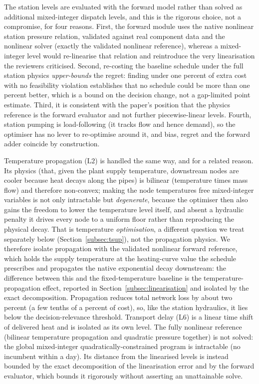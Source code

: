 \documentclass[a4paper,fleqn]{cas-sc}
\newcommand{\Ltwo}{\ensuremath{\mathrm{L2}}}    %
\newcommand{\Lsix}{\ensuremath{\mathrm{L6}}}    %
\begin{document}
The station levels are evaluated with the forward model rather than solved as additional
mixed-integer dispatch levels, and this is the rigorous choice, not a compromise, for four
reasons. First, the forward module uses the native nonlinear station pressure relation,
validated against real component data and the nonlinear solver (exactly the validated
nonlinear reference), whereas a mixed-integer level would re-linearise
that relation and reintroduce the very linearisation the reviewers criticised. Second,
re-costing the baseline schedule under the full station physics \emph{upper-bounds} the regret:
finding under one percent of extra cost with no feasibility violation establishes that no schedule
could be more than one percent better, which is a bound on the decision change, not a
gap-limited point estimate. Third, it is consistent with the paper's position that the physics
reference is the forward evaluator and not further piecewise-linear levels. Fourth, station
pumping is load-following (it tracks flow and hence demand), so the optimiser has no lever to
re-optimise around it, and bias, regret and the forward adder coincide by construction.

Temperature propagation ($\Ltwo$) is handled the same way, and for a related reason. Its physics
(that, given the plant supply temperature, downstream nodes are cooler because heat decays
along the pipes) is bilinear (temperature times mass flow) and therefore non-convex; making the
node temperatures free mixed-integer variables is not only intractable but \emph{degenerate},
because the optimiser then also gains the freedom to lower the temperature level itself, and
absent a hydraulic penalty it drives every node to a uniform floor rather than reproducing the
physical decay. That is temperature \emph{optimisation}, a different question we treat separately
below (Section~\ref{subsec:tsup}), not the propagation physics. We therefore isolate propagation
with the validated nonlinear forward reference, which holds the supply temperature at the
heating-curve value the schedule prescribes and propagates the native exponential decay
downstream: the difference between this and the fixed-temperature baseline is the
temperature-propagation effect, reported in Section~\ref{subsec:linearisation} and isolated by
the exact decomposition. Propagation reduces total network loss by about two percent (a few
tenths of a percent of cost), so, like the station hydraulics, it lies below the
decision-relevance threshold.
Transport delay ($\Lsix$) is a linear time shift of delivered heat and is isolated as its own
level. The fully nonlinear reference (bilinear temperature propagation and quadratic
pressure together) is not solved: the global mixed-integer quadratically-constrained program
is intractable (no incumbent within a day). Its distance from the linearised levels is instead
bounded by the exact decomposition of the linearisation error and by the forward evaluator,
which bounds it rigorously without asserting an unattainable solve.
\end{document}
